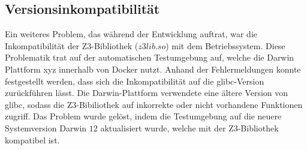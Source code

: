 \subsection{Versionsinkompatibilität}
Ein weiteres Problem, das während der Entwicklung auftrat, war die Inkompatibilität der Z3-Bibliothek ($z3lib.so$) mit dem Betriebssystem.
Diese Problematik trat auf der automatischen Testumgebung auf, welche die Darwin Plattform xyz innerhalb von Docker nutzt.
Anhand der Fehlermeldungen konnte festgestellt werden, dass sich die Inkompatibilität auf die glibc-Version zurückführen lässt.
Die Darwin-Plattform verwendete eine ältere Version von glibc, sodass die Z3-Bibiliothek auf inkorrekte oder nicht vorhandene Funktionen zugriff.
Das Problem wurde gelöst, indem die Testumgebung auf die neuere Systemversion Darwin $12$ aktualisiert wurde, welche mit der Z3-Bibliothek kompatibel ist.
